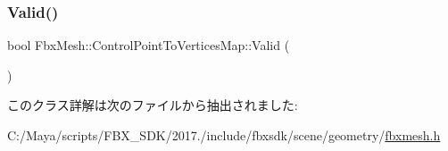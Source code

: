 \mbox{\label{class_fbx_mesh_1_1_control_point_to_vertices_map_af5295f57570dd004f1e574fdc96e2257}} 
\subsubsection{\texorpdfstring{Valid()}{Valid()}}
{\footnotesize\ttfamily bool Fbx\+Mesh\+::\+Control\+Point\+To\+Vertices\+Map\+::\+Valid (\begin{DoxyParamCaption}{ }\end{DoxyParamCaption})}



このクラス詳解は次のファイルから抽出されました\+:\begin{DoxyCompactItemize}
\item 
C\+:/\+Maya/scripts/\+F\+B\+X\+\_\+\+S\+D\+K/2017./include/fbxsdk/scene/geometry/\hyperlink{fbxmesh_8h}{fbxmesh.\+h}\end{DoxyCompactItemize}
